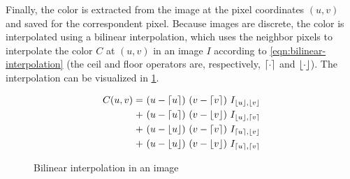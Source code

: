 Finally, the color is extracted from the image at the pixel coordinates $(u, v)$ and saved for the correspondent pixel. Because images are discrete, the color is interpolated using a bilinear interpolation, which uses the neighbor pixels to interpolate the color $C$ at $(u, v)$ in an image $I$ according to \cref{eqn:bilinear-interpolation} (the ceil and floor operators are, respectively, $\lceil \cdot \rceil$ and $\lfloor \cdot \rfloor$). The interpolation can be visualized in \cref{fig:bilinear-interpolation}.

\begin{equation}
    \label{eqn:bilinear-interpolation}
    \begin{aligned}
        C(u, v) = \ & (u - \ceil{u}) \ (v - \ceil{v}) \ I_{\floor{u}, \floor{v}} \\
                + \ &  (u - \ceil{u}) \ (v - \floor{v}) \ I_{\floor{u}, \ceil{v}} \\
                + \ &  (u - \floor{u}) \ (v - \ceil{v}) \ I_{\ceil{u}, \floor{v}} \\
                + \ &  (u - \floor{u}) \ (v - \floor{v}) \ I_{\ceil{u}, \ceil{v}} \\
    \end{aligned}
\end{equation}

\begin{figure}[h]
    \centering

    \caption{Bilinear interpolation in an image}
    \label{fig:bilinear-interpolation}

\end{figure}
